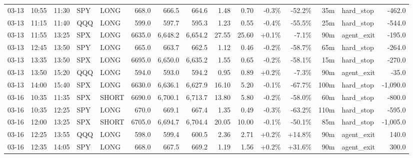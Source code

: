\documentclass[11pt,a4paper,twoside]{article}
\begin{document}
\begin{landscape}
\begin{center}
\begin{longtable}{>{\color{txtmain}}l l l l l r r r r r r r r >{\color{txtmain}}l r}
03-13 & 10:55 & 11:30 & SPY & LONG & 668.0 & 666.5 & 664.6 & 1.48 & 0.70 & \textcolor{lossred}{-0.3\%} & \textcolor{lossred}{-52.2\%} & 35m & hard\_stop & \textcolor{lossred}{-462.0} \\
03-13 & 11:15 & 11:40 & QQQ & LONG & 599.0 & 597.7 & 595.3 & 1.23 & 0.55 & \textcolor{lossred}{-0.4\%} & \textcolor{lossred}{-55.5\%} & 25m & hard\_stop & \textcolor{lossred}{-544.0} \\
03-13 & 11:55 & 13:25 & SPX & LONG & 6635.0 & 6,648.2 & 6,654.2 & 27.55 & 25.60 & \textcolor{wingreen}{+0.1\%} & \textcolor{lossred}{-7.1\%} & 90m & agent\_exit & \textcolor{lossred}{-195.0} \\
03-13 & 12:45 & 13:50 & SPY & LONG & 665.0 & 663.7 & 662.5 & 1.12 & 0.46 & \textcolor{lossred}{-0.2\%} & \textcolor{lossred}{-58.7\%} & 65m & hard\_stop & \textcolor{lossred}{-264.0} \\
03-13 & 13:35 & 13:50 & SPX & LONG & 6695.0 & 6,650.0 & 6,635.2 & 1.55 & 0.65 & \textcolor{lossred}{-0.2\%} & \textcolor{lossred}{-58.1\%} & 15m & hard\_stop & \textcolor{lossred}{-270.0} \\
03-13 & 13:50 & 15:20 & QQQ & LONG & 594.0 & 593.0 & 594.2 & 0.95 & 0.89 & \textcolor{wingreen}{+0.2\%} & \textcolor{lossred}{-7.3\%} & 90m & agent\_exit & \textcolor{lossred}{-35.0} \\
03-13 & 14:00 & 15:40 & SPX & LONG & 6630.0 & 6,636.1 & 6,627.9 & 16.10 & 5.20 & \textcolor{lossred}{-0.1\%} & \textcolor{lossred}{-67.7\%} & 100m & hard\_stop & \textcolor{lossred}{-1,090.0} \\
03-16 & 10:35 & 11:35 & SPX & SHORT & 6690.0 & 6,700.1 & 6,713.7 & 13.80 & 5.80 & \textcolor{lossred}{-0.2\%} & \textcolor{lossred}{-58.0\%} & 60m & hard\_stop & \textcolor{lossred}{-800.0} \\
03-16 & 10:35 & 12:25 & SPY & LONG & 670.0 & 669.1 & 667.4 & 1.35 & 0.49 & \textcolor{lossred}{-0.3\%} & \textcolor{lossred}{-63.2\%} & 110m & hard\_stop & \textcolor{lossred}{-595.0} \\
03-16 & 12:00 & 13:25 & SPX & SHORT & 6705.0 & 6,694.7 & 6,704.4 & 20.05 & 10.00 & \textcolor{lossred}{-0.1\%} & \textcolor{lossred}{-50.1\%} & 85m & hard\_stop & \textcolor{lossred}{-1,005.0} \\
03-16 & 12:25 & 13:55 & QQQ & LONG & 598.0 & 599.4 & 600.5 & 2.36 & 2.71 & \textcolor{wingreen}{+0.2\%} & \textcolor{wingreen}{+14.8\%} & 90m & agent\_exit & \textcolor{wingreen}{140.0} \\
03-16 & 12:35 & 14:05 & SPY & LONG & 668.0 & 667.5 & 669.2 & 1.19 & 1.56 & \textcolor{wingreen}{+0.2\%} & \textcolor{wingreen}{+31.6\%} & 90m & agent\_exit & \textcolor{wingreen}{300.0} \\

\end{longtable}
\end{center}
\end{landscape}
\end{document}
